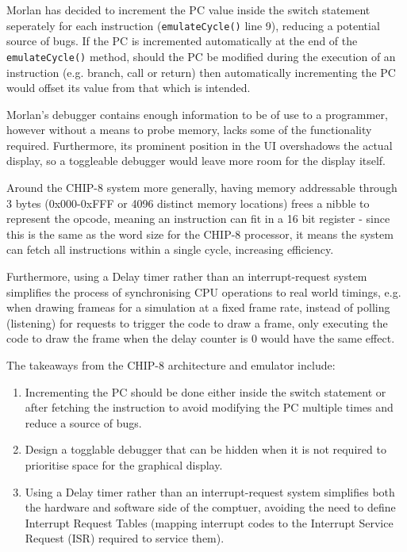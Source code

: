\bigskip


Morlan has decided to increment the PC value inside the switch statement seperately for each instruction (\texttt{emulateCycle()} line 9), reducing a potential source of bugs. If the PC is incremented automatically at the end of the \texttt{emulateCycle()} method, should the PC be modified during the execution of an instruction (e.g. branch, call or return) then automatically incrementing the PC would offset its value from that which is intended. 

Morlan's debugger contains enough information to be of use to a programmer, however without a means to probe memory, lacks some of the functionality required. Furthermore, its prominent position in the UI overshadows the actual display, so a toggleable debugger would leave more room for the display itself.

Around the CHIP-8 system more generally, having memory addressable through 3 bytes (0x000-0xFFF or 4096 distinct memory locations) frees a nibble to represent the opcode, meaning an instruction can fit in a 16 bit register - since this is the same as the word size for the CHIP-8 processor, it means the system can fetch all instructions within a single cycle, increasing efficiency.

Furthermore, using a Delay timer rather than an interrupt-request system simplifies the process of synchronising CPU operations to real world timings, e.g. when drawing frameas for a simulation at a fixed frame rate, instead of polling (listening) for requests to trigger the code to draw a frame, only executing the code to draw the frame when the delay counter is 0 would have the same effect.

The takeaways from the CHIP-8 architecture and emulator include:
\begin{enumerate}
    \item Incrementing the PC should be done either inside the switch statement or after fetching the instruction to avoid modifying the PC multiple times and reduce a source of bugs.
    \item Design a togglable debugger that can be hidden when it is not required to prioritise space for the graphical display.
    \item Using a Delay timer rather than an interrupt-request system simplifies both the hardware and software side of the comptuer, avoiding the need to define Interrupt Request Tables (mapping interrupt codes to the Interrupt Service Request (ISR) required to service them).
\end{enumerate}

